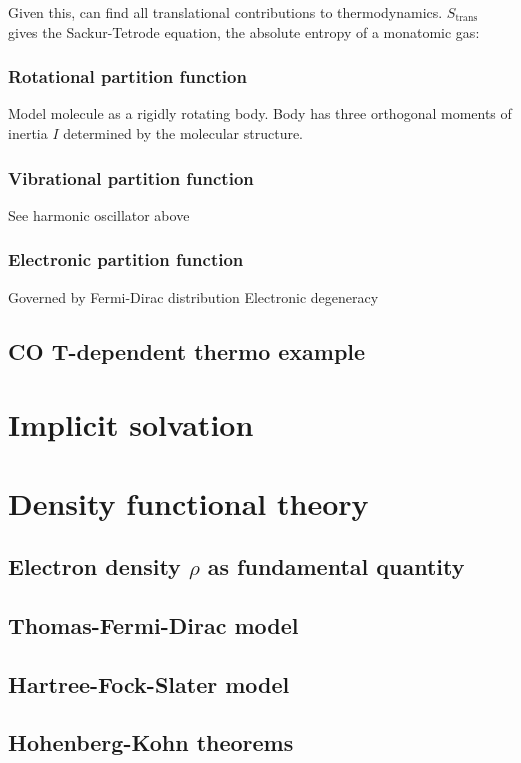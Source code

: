\documentclass[11pt]{article}
\begin{document}
Given this, can find all translational contributions to thermodynamics.
$S_\mathrm{trans}$ gives the Sackur-Tetrode equation, the absolute entropy of a
monatomic gas:


\subsubsection{Rotational partition function}
\label{sec-12-2-2}
Model molecule as a rigidly rotating body.  Body has three orthogonal moments
of inertia $I$ determined by the molecular structure.

\subsubsection{Vibrational partition function}
\label{sec-12-2-3}
See harmonic oscillator above

\subsubsection{Electronic partition function}
\label{sec-12-2-4}
Governed by Fermi-Dirac distribution
Electronic degeneracy


\subsection{CO T-dependent thermo example}
\label{sec-12-3}
\newpage
\section{Implicit solvation}
\label{sec-13}
\section{Density functional theory}
\label{sec-14}
\subsection{Electron density $\rho$ as fundamental quantity}
\label{sec-14-1}
\subsection{Thomas-Fermi-Dirac model}
\label{sec-14-2}
\subsection{Hartree-Fock-Slater model}
\label{sec-14-3}
\subsection{Hohenberg-Kohn theorems}
\label{sec-14-4}
\end{document}
